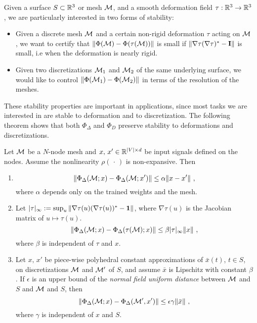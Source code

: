 Given a surface $S \subset {\mathbb{R}}^3$ or mesh ${\mathcal{M}}$, and a smooth deformation field $\tau: {\mathbb{R}}^3 \to {\mathbb{R}}^3$, 
we are particularly interested in two forms of stability: 
\begin{itemize} 
\item Given a discrete mesh ${\mathcal{M}}$ and a certain non-rigid deformation $\tau$ 
acting on ${\mathcal{M}}$, we want to certify that $ \| \Phi({\mathcal{M}}) - \Phi(\tau({\mathcal{M}})) \|$ is 
small if $\| \nabla \tau ( \nabla \tau)^* - {\bf I} \| $ is small, i.e when the deformation is nearly rigid.
 \item Given two discretizations ${\mathcal{M}}_1$ and ${\mathcal{M}}_2$ of the same underlying surface, 
we would like to control $\| \Phi( {\mathcal{M}}_1) - \Phi({\mathcal{M}}_2) \| $ in terms of the resolution of the meshes. 
\end{itemize}
These stability properties are important in applications, since most tasks we are interested in 
are stable to deformation and to discretization. The following theorem shows that both $\Phi_\Delta$ and $\Phi_D$ 
preserve stability to deformations and discretizations. 
\begin{theorem}
\label{stabtheo}
Let ${\mathcal{M}}$ be a $N$-node mesh and $x,\,x' \in {\mathbb{R}}^{|V| \times d}$ be 
 input signals defined on the nodes. Assume the nonlinearity $\rho(\,\cdot \,)$ is 
 non-expansive. Then
\begin{enumerate}[label=(\alph*)]
\item 
\begin{equation}
\label{ya1}
\| \Phi_\Delta({\mathcal{M}}; x) - \Phi_\Delta({\mathcal{M}}; x') \| \leq \alpha \| x - x' \|~,
\end{equation}
where $\alpha$ depends only on the trained weights and the mesh.
\item Let $| \tau |_\infty := \sup_u \| \nabla \tau(u) (\nabla \tau(u))^* - {\bf 1} \|$, where $\nabla \tau(u)$ is the Jacobian
matrix of $u \mapsto \tau(u)$. 
\begin{equation}
\label{ya2}
\| \Phi_\Delta({\mathcal{M}}; x) - \Phi_\Delta( \tau({\mathcal{M}}); x) \| \leq \beta | \tau |_\infty \|x \|~,
\end{equation}
where $\beta$ is independent of $\tau$ and $x$.
\item Let $x,\,x'$ be piece-wise polyhedral constant approximations of $\bar{x}(t)$, $t \in S$, 
on discretizations ${\mathcal{M}}$ and ${\mathcal{M}}'$ of $S$, and assume $\bar{x}$ is Lipschitz with constant $\beta$.
If $\epsilon$ is an upper bound of the \emph{normal field uniform distance} \cite{laplacian_convergence} between ${\mathcal{M}}$ and $S$ 
and ${\mathcal{M}}$ and $S$, then
\begin{equation}
\label{ya3}
\| \Phi_\Delta({\mathcal{M}};x) - \Phi_\Delta({\mathcal{M}}', x') \| \leq \epsilon \gamma \|\bar{x} \|~,
\end{equation}
where $\gamma$ is independent of $x$ and $S$.
\end{enumerate}
\end{theorem}

